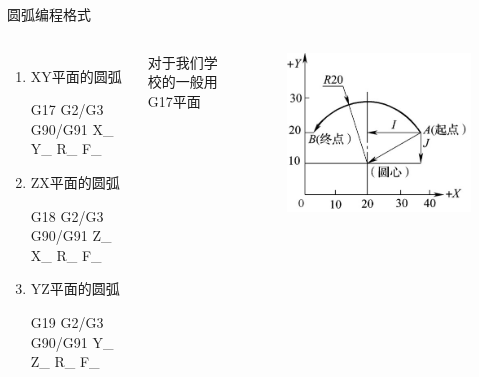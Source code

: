 \documentclass[UTF8,zihao=-4]{ctexbeamer}
\begin{document}
\begin{frame}{圆弧编程格式}
    \begin{columns}

 \begin{enumerate}
     \item XY平面的圆弧 
   
 G17  G2/G3  G90/G91 X\_ Y\_ R\_ F\_
 
 \item ZX平面的圆弧 
   
 G18 G2/G3 G90/G91 Z\_ X\_ R\_ F\_
 
\item  YZ平面的圆弧   
 
 G19 G2/G3 G90/G91 Y\_ Z\_ R\_ F\_
 
 \end{enumerate}
  对于我们学校的一般用G17平面
        \begin{figure}
            \centering
            \includegraphics[width=1\linewidth]{image/4-3}
            \caption{}
            \label{fig:4-3}
        \end{figure}
        
        
    \end{columns}
\end{frame}
\end{document}
